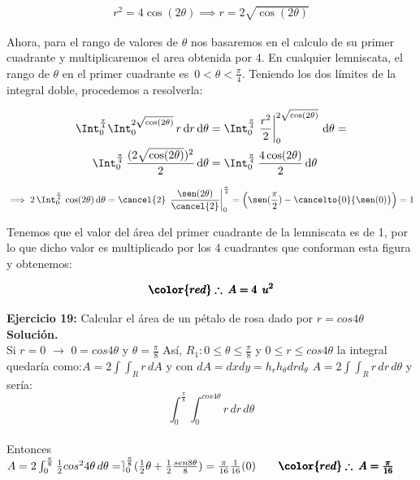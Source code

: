 \documentclass[12pt]{article}
\begin{document}
\begin{align*}
	r^2 = 4\cos(2\theta) \implies r = 2\sqrt{\cos(2\theta)}
\end{align*}

\noindent Ahora, para el rango de valores de $\theta$ nos basaremos en el calculo de su primer cuadrante y multiplicaremos el area obtenida por 4. En cualquier lemniscata, el rango de $\theta$ en el primer cuadrante es $\,0<\theta<\frac{\pi}{4}$. Teniendo los dos límites de la integral doble, procedemos a resolverla:

\begin{align*}
	\Int_{0}^{\frac{\pi}{4}} \Int_{0}^{2\sqrt{\cos(2\theta)}}\, r\,\mathrm{d}r\,\mathrm{d}\theta &= \Int_{0}^{\frac{\pi}{4}} \left.\frac{r^2}{2}\right|_{0}^{2\sqrt{\cos(2\theta)}}\,\mathrm{d}\theta = \\ \Int_{0}^{\frac{\pi}{4}}\,\frac{(2\sqrt{\cos(2\theta)})^2}{2}\,\mathrm{d}\theta &= \Int_{0}^{\frac{\pi}{4}}\, \frac{4\cos(2\theta)}{2}\,\mathrm{d}\theta
\end{align*}

\begin{align*}
	\implies 2\,\Int_{0}^{\frac{\pi}{4}}\, \cos(2\theta)\,\mathrm{d}\theta = \cancel{2}\,\left.\frac{\sen(2\theta)}{\cancel{2}}\right|_{0}^{\frac{\pi}{4}} = \left(\sen(\frac{\pi}{2}) - \cancelto{0}{\sen(0)}\right) = 1
\end{align*}

\noindent Tenemos que el valor del área del primer cuadrante de la lemniscata es de 1, por lo que dicho valor es multiplicado por los 4 cuadrantes que conforman esta figura y obtenemos:

\begin{align*}
	\pmb{\color{red} \therefore\: A = 4\: \: u^2}
\end{align*}

\textbf{Ejercicio 19:} Calcular el área de un pétalo de rosa dado por $r=cos4\theta$
\\[10pt]
\textbf{Solución.}
\\[10pt]
Si $r=0$ $\rightarrow$ $0=cos4\theta$ y $\theta=\frac{\pi}{8}$ Así, $R_{1}: 0\leq \theta \leq\frac{\pi}{8}$ y $0\leq r \leq cos4\theta$ la integral quedaría como:$ A=2\int \int_{R} r \,dA$ y con $dA=dxdy=h_{r}h_{\theta}drd_{\theta}$ \hspace{0.2cm} $A=2\int \int_{R} r \,dr \, d\theta$ y sería:
\[ \int_{0}^{\frac{\pi}{8}} \int_{0}^{cos4\theta} r \,dr\,d\theta \]
\\[2pt]
Entonces $A=2\int_{0}^{\frac{\pi}{8}}\frac{1}{2}cos^24\theta \,d\theta=\rceil_{0}^{\frac{\pi}{8}}(\frac{1}{2}\theta+\frac{1}{2}\frac{sen8\theta}{8})=\frac{\pi}{16}\frac{1}{16}(0) \qquad \pmb{\color{red} \therefore \: A=\frac{\pi}{16}}$
\\[15pt]
\end{document}
